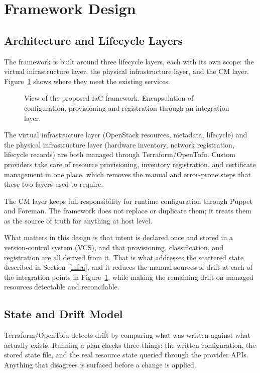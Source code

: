 \section{Framework Design}\label{design}

\subsection{Architecture and Lifecycle Layers}
The framework is built around three lifecycle layers, each with its own scope: the virtual infrastructure layer, the physical infrastructure layer, and the CM layer. Figure~\ref{fig:framework-layers} shows where they meet the existing services.

\begin{figure}[tbp]
  \centering
    \scalebox{0.95}{}
  \caption{View of the proposed IaC framework. Encapsulation of configuration, provisioning and registration through an integration layer.}
  \label{fig:framework-layers}
\end{figure}

The virtual infrastructure layer (OpenStack resources, metadata, lifecycle) and the physical infrastructure layer (hardware inventory, network registration, lifecycle records) are both managed through Terraform/OpenTofu. Custom providers take care of resource provisioning, inventory registration, and certificate management in one place, which removes the manual and error-prone steps that these two layers used to require.

The CM layer keeps full responsibility for runtime configuration through Puppet and Foreman. The framework does not replace or duplicate them; it treats them as the source of truth for anything at host level.

What matters in this design is that intent is declared once and stored in a version-control system (VCS), and that provisioning, classification, and registration are all derived from it. That is what addresses the scattered state described in Section~\ref{infra}, and it reduces the manual sources of drift at each of the integration points in Figure~\ref{fig:framework-layers}, while making the remaining drift on managed resources detectable and reconcilable.

\subsection{State and Drift Model}

Terraform/OpenTofu detects drift by comparing what was written against what actually exists. Running a plan checks three things: the written configuration, the stored state file, and the real resource state queried through the provider APIs. Anything that disagrees is surfaced before a change is applied.

